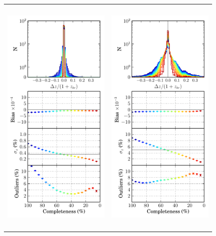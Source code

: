 \begin{figure}
\centering
\begin{tabular}{rl}
\includegraphics[type=pdf,ext=.pdf,read=.pdf, height=120mm]{./plots/mock.r260.n1e6.s10.121027_default_bright_interp2_whole} & \includegraphics[type=pdf,ext=.pdf,read=.pdf, height=120mm]{./plots/mock.r260.n1e6.s10.121027_default_faint_interp2_whole}
\end{tabular}

\end{figure}
